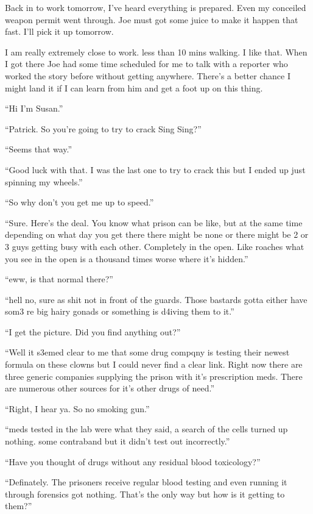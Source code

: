 Back in to work tomorrow, I've heard everything is prepared. Even my conceiled weapon permit went through. Joe must got some juice to make it happen that fast. I'll pick it up tomorrow.

I am really extremely close to work. less than 10 mins walking. I like that. When I got there Joe had some time scheduled for me to talk with a reporter who worked the story before without getting anywhere. There's a better chance I might land it if I can learn from him and get a foot up on this thing.

``Hi I'm Susan.''

``Patrick. So you're going to try to crack Sing Sing?''

``Seems that way.''

``Good luck with that. I was the last one to try to crack this but I ended up just spinning my wheels.''

``So why don't you get me up to speed.''

``Sure. Here's the deal. You know what prison can be like, but at the same time depending on what day you get there there might be none or there might be 2 or 3 guys getting busy with each other. Completely in the open. Like roaches what you see in the open is a thousand times worse where it's hidden.''

``eww, is that normal there?''

``hell no, sure as shit not in front of the guards. Those bastards gotta either have som3 re big hairy gonads or something is d4iving them to it.''

``I get the picture. Did you find anything out?''

``Well it s3emed clear to me that some drug compqny is testing their newest formula on these clowns but I could never find a clear link. Right now there are three generic companies supplying the prison with it's prescription meds. There are numerous other sources for it's other drugs of need.''

``Right, I hear ya. So no smoking gun.''

``meds tested in the lab were what they said, a search of the cells turned up nothing. some contraband but it didn't test out incorrectly.''

``Have you thought of drugs without any residual blood toxicology?''

``Definately. The prisoners receive regular blood testing and even running it through forensics got nothing. That's the only way but how is it getting to them?''


